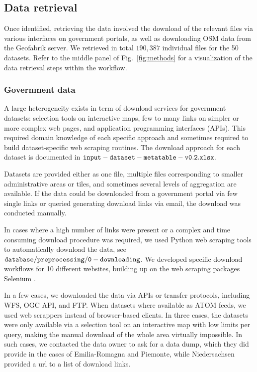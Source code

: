\documentclass[fleqn,10pt]{wlscirep}
\begin{document}
\subsection*{Data retrieval}

Once identified, retrieving the data involved the download of the relevant files via various interfaces on government portals, as well as downloading OSM data from the Geofabrik server. We retrieved in total $190,387$ individual files for the 50 datasets. Refer to the middle panel of Fig.~\ref{fig:methods} for a visualization of the data retrieval steps within the workflow.


\subsubsection*{Government data}

A large heterogeneity exists in term of download services for government datasets: selection tools on interactive maps, few to many links on simpler or more complex web pages, and  application programming interfaces (APIs). This required domain knowledge of each specific approach and sometimes required to build dataset-specific web scraping routines. The download approach for each dataset is documented in ${\tt input-dataset-metatable-v0.2.xlsx}$. 

Datasets are provided either as one file, multiple files corresponding to smaller administrative areas or tiles, and sometimes several levels of aggregation are available. If the data could be downloaded from a government portal via few single links or queried generating download links via email, the download was conducted manually.

In cases where a high number of links were present or a complex and time consuming download procedure was required, we used Python web scraping tools to automatically download the data, see ${\tt database/preprocessing/0-downloading}$\cite{eubucco-0.2-code2022}. 
We developed specific download workflows for 10 different websites, building up on the web scraping packages Selenium \cite{selenium_2022}.

In a few cases, we downloaded the data via APIs or transfer protocols, including WFS, OGC API, and FTP. When datasets where available as ATOM feeds, we used web scrappers instead of browser-based clients. 
In three cases, the datasets were only available via a selection tool on an interactive map with low limits per query, making the manual download of the whole area virtually impossible. In such cases, we contacted the data owner to ask for a data dump, which they did provide in the cases of Emilia-Romagna and Piemonte, while Niedersachsen provided a url to a list of download links.  
\end{document}
